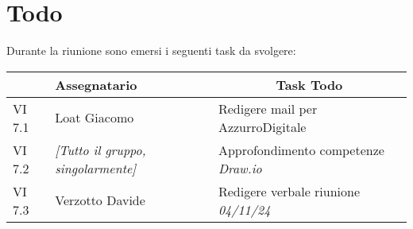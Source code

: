 \section{Todo}

Durante la riunione sono emersi i seguenti task da svolgere:

\vspace{0.5cm}

\begin{table}[htbp]
\begin{tabular}{|p{}|p{}|p{}|}
    \hline
    \rowcolor[gray]{0.9}
    \multicolumn{1}{|c|}{\textbf{Codice}} & {\textbf{Assegnatario}} & \multicolumn{1}{|c|}{\textbf{Task Todo}} \\
    \hline
    VI 7.1 & Loat Giacomo & Redigere mail per AzzurroDigitale \\
    \hline
    VI 7.2 & \emph{[Tutto il gruppo, singolarmente]} & Approfondimento competenze \emph{Draw.io} \\
    \hline
    VI 7.3 & Verzotto Davide & Redigere verbale riunione \emph{04/11/24} \\
    \hline
\end{tabular}
\end{table}
